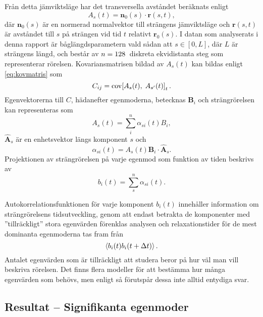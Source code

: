 Från detta jämviktsläge har det transversella avståndet beräknats enligt 
\begin{equation}
A_s(t) = \mathbf{n}_0(s)\cdot\mathbf{r}(s,t),
\end{equation}
där $\mathbf{n}_0(s)$ är en normerad normalvektor till strängens jämviktsläge och $\mathbf{r}(s,t)$ är avståndet till $s$ på strängen vid tid $t$ relativt $\mathbf{r}_0(s)$. I datan som analyserats i denna rapport är båglängdsparametern vald sådan att $s\in[0,L]$, där $L$ är strängens längd, och består av $n=\unit[128]{}$ diskreta ekvidistanta steg som representerar rörelsen. Kovariansmatrisen bildad av $A_s(t)$ kan bildas enligt \eqref{eq:kovmatris} som 
\begin{equation}
\label{eq:C}
    C_{ij} = \text{cov}\!\left[A_s(t),\;A_{s'}(t)\right]_t.
\end{equation}
Egenvektorerna till $C$, hädanefter egenmoderna, betecknas $\mathbf{B}_i$ och strängrörelsen kan representeras som
\begin{equation}
    A_s(t) = \sum_i^n \alpha_{si}(t)B_i,
\end{equation}
$\hat{\mathbf{A}}_s$ är en enhetsvektor längs komponent $s$ och 
\begin{equation}
    \alpha_{si}(t) = A_s(t)\mathbf{B}_i\cdot\hat{\mathbf{A}}_s.
\end{equation}
Projektionen av strängrörelsen på varje egenmod som funktion av tiden beskrivs av
\begin{equation}
    b_i(t) = \sum_s^n \alpha_{si}(t).
\end{equation}

Autokorrelationsfunktionen för varje komponent $b_i(t)$ innehåller information om strängrörelsens tidsutveckling, genom att endast betrakta de komponenter med ''tillräckligt'' stora egenvärden förenklas analysen och relaxationstider för de mest dominanta egenmoderna tas fram från 
\begin{equation}
    \ev{b_i(t)b_i(t+\Delta t)}.
\end{equation}
Antalet egenvärden som är tillräckligt att studera beror på hur väl man vill beskriva rörelsen. Det finns flera modeller för att bestämma hur många egenvärden som behövs, men enligt \cite{Cangelosi2007} så förutspår dessa inte alltid entydiga svar. 

\subsection{Resultat -- Signifikanta egenmoder}

